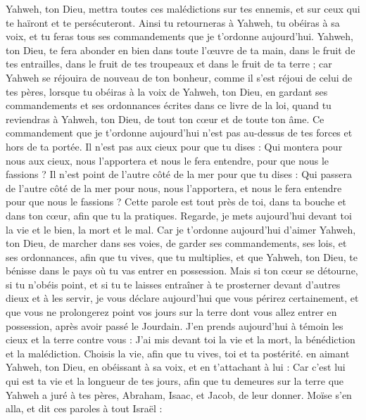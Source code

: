 \begin{multicols}{2}
Yahweh, ton Dieu, mettra toutes ces malédictions sur tes ennemis, et sur ceux qui te haïront et te persécuteront.
Ainsi tu retourneras à Yahweh, tu obéiras à sa voix, et tu feras tous ses commandements que je t'ordonne aujourd'hui.
Yahweh, ton Dieu, te fera abonder en bien dans toute l'œuvre de ta main, dans le fruit de tes entrailles, dans le fruit de tes troupeaux et dans le fruit de ta terre ; car Yahweh se réjouira de nouveau de ton bonheur, comme il s'est réjoui de celui de tes pères,
lorsque tu obéiras à la voix de Yahweh, ton Dieu, en gardant ses commandements et ses ordonnances écrites dans ce livre de la loi, quand tu reviendras à Yahweh, ton Dieu, de tout ton cœur et de toute ton âme.
Ce commandement que je t'ordonne aujourd'hui n'est pas au-dessus de tes forces et hors de ta portée.
Il n'est pas aux cieux pour que tu dises : Qui montera pour nous aux cieux, nous l'apportera et nous le fera entendre, pour que nous le fassions ?
Il n'est point de l'autre côté de la mer pour que tu dises : Qui passera de l'autre côté de la mer pour nous, nous l'apportera, et nous le fera entendre pour que nous le fassions ?
Cette parole est tout près de toi, dans ta bouche et dans ton cœur, afin que tu la pratiques.
Regarde, je mets aujourd'hui devant toi la vie et le bien, la mort et le mal.
Car je t'ordonne aujourd'hui d'aimer Yahweh, ton Dieu, de marcher dans ses voies, de garder ses commandements, ses lois, et ses ordonnances, afin que tu vives, que tu multiplies, et que Yahweh, ton Dieu, te bénisse dans le pays où tu vas entrer en possession.
Mais si ton cœur se détourne, si tu n'obéis point, et si tu te laisses entraîner à te prosterner devant d'autres dieux et à les servir,
je vous déclare aujourd'hui que vous périrez certainement, et que vous ne prolongerez point vos jours sur la terre dont vous allez entrer en possession, après avoir passé le Jourdain.
J'en prends aujourd'hui à témoin les cieux et la terre contre vous : J'ai mis devant toi la vie et la mort, la bénédiction et la malédiction. Choisis la vie, afin que tu vives, toi et ta postérité.
en aimant Yahweh, ton Dieu, en obéissant à sa voix, et en t'attachant à lui : Car c'est lui qui est ta vie et la longueur de tes jours, afin que tu demeures sur la terre que Yahweh a juré à tes pères, Abraham, Isaac, et Jacob, de leur donner.
\VerseOne{}Moïse s'en alla, et dit ces paroles à tout Israël :

\end{multicols}
